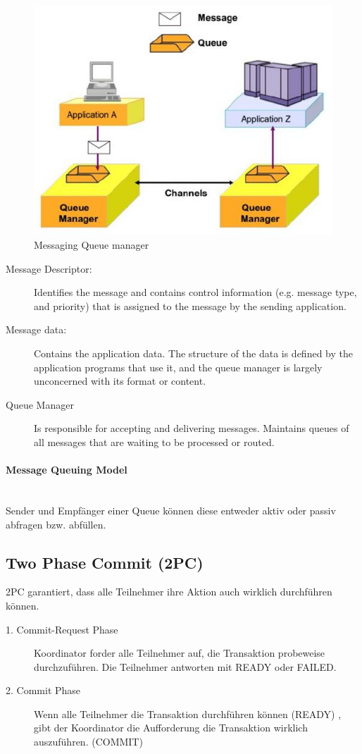 \begin{figure}[h!]
	\centering
	\includegraphics[width=0.5\linewidth]{img/messaging_queue_manager}
	\caption{Messaging Queue manager}
	\label{fig:messagingqueuemanager}
\end{figure}

\begin{description}
	\item[Message Descriptor: ] Identifies the message and contains control information (e.g. message type, and priority) that is assigned to the message by the sending application.
	\item[Message data:] Contains the application data. The structure of the data is defined by the application programs that use it, and the queue manager is largely unconcerned with its format or content.
	\item[Queue Manager] Is responsible for accepting and delivering messages. Maintains queues of all messages that are waiting to be processed or routed. 
\end{description}

\paragraph{Message Queuing Model} \hfill \\
Sender und Empfänger einer Queue können diese entweder aktiv oder passiv abfragen bzw. abfüllen.

\clearpage

\subsection{Two Phase Commit (2PC)}
2PC garantiert, dass alle Teilnehmer ihre Aktion auch wirklich durchführen können. 
\begin{description}
	\item[1. Commit-Request Phase] Koordinator forder alle Teilnehmer auf, die Transaktion probeweise durchzuführen. Die Teilnehmer antworten mit READY oder FAILED.
	\item[2. Commit Phase] Wenn alle Teilnehmer die Transaktion durchführen können (READY) , gibt der Koordinator die Aufforderung die Transaktion wirklich auszuführen. (COMMIT)
\end{description}

